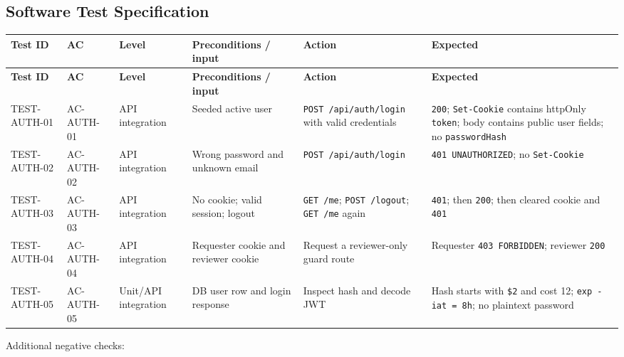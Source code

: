 \documentclass[11pt,a4paper]{article}
\begin{document}
\subsection{Software Test Specification}


\small
\vspace{0.3em}
\begin{longtable}{|>{\RaggedRight}p{1.6cm}|>{\centering\arraybackslash}p{1.4cm}|>{\centering\arraybackslash}p{1.2cm}|>{\RaggedRight}p{3.8cm}|>{\RaggedRight}p{3.8cm}|>{\RaggedRight}p{4.0cm}|}
\hline
\rowcolor{zenPale}\textbf{Test ID} & \textbf{AC} & \textbf{Level} & \textbf{Preconditions / input} & \textbf{Action} & \textbf{Expected} \\ \hline
\endfirsthead
\hline
\rowcolor{zenPale}\textbf{Test ID} & \textbf{AC} & \textbf{Level} & \textbf{Preconditions / input} & \textbf{Action} & \textbf{Expected} \\ \hline
\endhead
\hline
\endfoot
TEST-AUTH-01 & AC-AUTH-01 & API integration & Seeded active user & \texttt{POST /\allowbreak api/\allowbreak auth/\allowbreak login} with valid credentials & \texttt{200}; \texttt{Set-\allowbreak Cookie} contains httpOnly \texttt{token}; body contains public user fields; no \texttt{passwordHash} \\ \hline
TEST-AUTH-02 & AC-AUTH-02 & API integration & Wrong password and unknown email & \texttt{POST /\allowbreak api/\allowbreak auth/\allowbreak login} & \texttt{401 UNAUTHORIZED}; no \texttt{Set-\allowbreak Cookie} \\ \hline
TEST-AUTH-03 & AC-AUTH-03 & API integration & No cookie; valid session; logout & \texttt{GET /\allowbreak me}; \texttt{POST /\allowbreak logout}; \texttt{GET /\allowbreak me} again & \texttt{401}; then \texttt{200}; then cleared cookie and \texttt{401} \\ \hline
TEST-AUTH-04 & AC-AUTH-04 & API integration & Requester cookie and reviewer cookie & Request a reviewer-only guard route & Requester \texttt{403 FORBIDDEN}; reviewer \texttt{200} \\ \hline
TEST-AUTH-05 & AC-AUTH-05 & Unit/API integration & DB user row and login response & Inspect hash and decode JWT & Hash starts with \texttt{\$2} and cost 12; \texttt{exp -\allowbreak  iat = 8h}; no plaintext password \\ \hline
\end{longtable}
\vspace{0.3em}


Additional negative checks:\\
\end{document}
